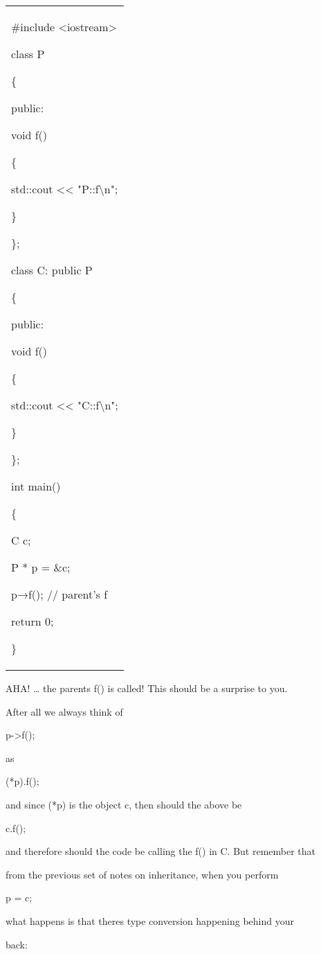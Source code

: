 \documentclass[
]{article}
\begin{document}
\begin{longtable}[]{@{}
  >{\raggedright\arraybackslash}p{}@{}}
\toprule\noalign{}
 \\
\midrule\noalign{}
\endhead
\bottomrule\noalign{}
\endlastfoot
\#include \textless iostream\textgreater{}

class P

\{

public:

void f()

\{

std::cout \textless\textless{} "P::f\textbackslash n";

\}

\};

class C: public P

\{

public:

void f()

\{

std::cout \textless\textless{} "C::f\textbackslash n";

\}

\};

int main()

\{

C c;

P * p = \&c;

p→f(); // parent's f

return 0;

\} \\
\end{longtable}

AHA! \ldots{} the parent\textquotesingle s f() is called! This should be
a surprise to you.

After all we always think of

p-\textgreater f();

as

(*p).f();

and since (*p) is the object c, then should the above be

c.f();

and therefore should the code be calling the f() in C. But remember that

from the previous set of notes on inheritance, when you perform

p = c;

what happens is that there\textquotesingle s type conversion happening
behind your

back:
\end{document}
